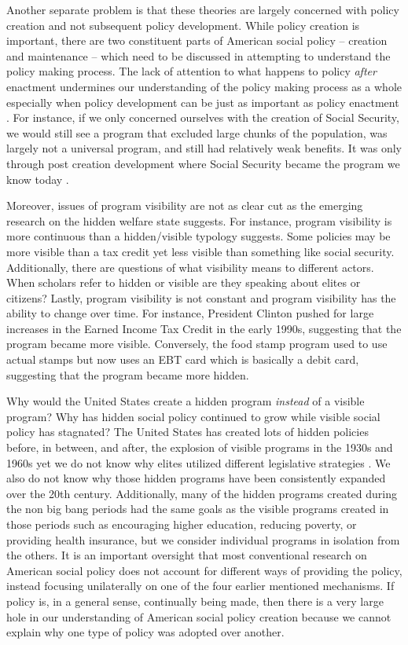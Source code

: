 \documentclass[12pt]{article}
\begin{document}
Another separate problem is that these theories are largely concerned with policy creation and not subsequent policy development. While policy creation is important, there are two constituent parts of American social policy -- creation and maintenance -- which need to be discussed in attempting to understand the policy making process. The lack of attention to what happens to policy \emph{after} enactment undermines our understanding of the policy making process as a whole especially when policy development can be just as important as policy enactment \citep{patashnik2008}. For instance, if we only concerned ourselves with the creation of Social Security, we would still see a program that excluded large chunks of the population, was largely not a universal program, and still had relatively weak benefits. It was only through post creation development where Social Security became the program we know today \citep{derthick1979}. 

Moreover, issues of program visibility are not as clear cut as the emerging research on the hidden welfare state suggests. For instance, program visibility is more continuous than a hidden/visible typology suggests. Some policies may be more visible than a tax credit yet less visible than something like social security. Additionally, there are questions of what visibility means to different actors. When scholars refer to hidden or visible are they speaking about elites or citizens? Lastly, program visibility is not constant and program visibility has the ability to change over time. For instance, President Clinton pushed for large increases in the Earned Income Tax Credit in the early 1990s, suggesting that the program became more visible. Conversely, the food stamp program used to use actual stamps but now uses an EBT card which is basically a debit card, suggesting that the program became more hidden. 

Why would the United States create a hidden program \emph{instead} of a visible program? Why has hidden social policy continued to grow while visible social policy has stagnated? The United States has created lots of hidden policies before, in between, and after, the explosion of visible programs in the 1930s and 1960s yet we do not know why elites utilized different legislative strategies \citep[Ch. 2]{howard2008}. We also do not know why those hidden programs have been consistently expanded over the 20th century. Additionally, many of the hidden programs created during the non big bang periods had the same goals as the visible programs created in those periods such as encouraging higher education, reducing poverty, or providing health insurance, but we consider individual programs in isolation from the others. It is an important oversight that most conventional research on American social policy does not account for different ways of providing the policy, instead focusing unilaterally on one of the four earlier mentioned mechanisms. If policy is, in a general sense, continually being made, then there is a very large hole in our understanding of American social policy creation because we cannot explain why one type of policy was adopted over another.
\end{document}

